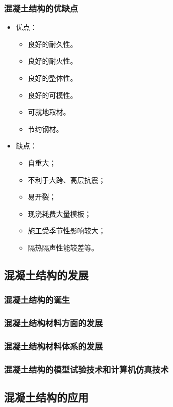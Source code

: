 \documentclass{article}
\begin{document}
\subsubsection{混凝土结构的优缺点}
\begin{itemize}
    \item 优点：
          \begin{itemize}
              \item 良好的耐久性。
              \item 良好的耐火性。
              \item 良好的整体性。
              \item 良好的可模性。
              \item 可就地取材。
              \item 节约钢材。
          \end{itemize}
    \item 缺点：
          \begin{itemize}
              \item 自重大；
              \item 不利于大跨、高层抗震；
              \item 易开裂；
              \item 现浇耗费大量模板；
              \item 施工受季节性影响较大；
              \item 隔热隔声性能较差等。
          \end{itemize}
\end{itemize}
\subsection{混凝土结构的发展}
\subsubsection{混凝土结构的诞生}
\subsubsection{混凝土结构材料方面的发展}
\subsubsection{混凝土结构材料体系的发展}
\subsubsection{混凝土结构的模型试验技术和计算机仿真技术}
\subsection{混凝土结构的应用}
\end{document}
